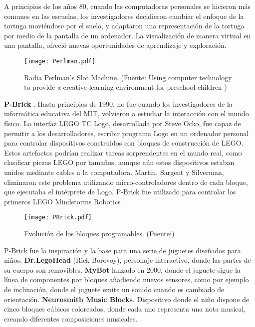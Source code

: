 A principios de los años 80, cuando las computadoras personales se hicieron más comunes en las escuelas, los investigadores decidieron cambiar el enfoque de la tortuga moviéndose por el suelo, y adaptaron una representación de la tortuga por medio de la pantalla de un ordenador. La visualización de manera virtual en una pantalla, ofreció nuevas oportunidades de aprendizaje y exploración.

\begin{figure}[!h]
\begin{center}
\texttt{[image: Perlman.pdf]}
\caption{Radia Perlman’s Slot Machine. (Fuente: Using computer technology to provide a creative learning environment for preschool children  \cite{Perlman})}
\label{fig:Perlman}
\end{center}
\end{figure}

\textbf{P-Brick} \cite{LegoLogo}. Hasta principios de 1990, no fue cuando los investigadores de la informática educativa del MIT, volvieron a estudiar la interacción con el mundo físico. La interfaz LEGO TC Logo, desarrollada por Steve Ocko, fue capaz de permitir a los desarrolladores, escribir programa Logo en un ordenador personal para controlar dispositivos construidos con bloques de construcción de LEGO. Estos artefactos podrían realizar tareas sorprendentes en el mundo real, como clasificar piezas LEGO por tamaños, aunque aún estos dispositivos estaban unidos mediante cables a la computadora. Martin, Sargent y Silverman, eliminaron este problema utilizando micro-controladores dentro de cada bloque, que ejecutaba el intérprete de Logo.
P-Brick fue utilizado para controlar los primeros LEGO Mindstorms Robotics

\begin{figure}[!h]
\begin{center}
\texttt{[image: PBrick.pdf]}
\caption{Evolución de los bloques programables. (Fuente:\cite{McNerney})}
\label{fig:PBrick}
\end{center}
\end{figure}

P-Brick fue la inspiración y la base para una serie de juguetes diseñados para niños. \textbf{Dr.LegoHead} (Rick Borovoy), personaje interactivo, donde las partes de su cuerpo son removibles. \textbf{MyBot} lanzado en 2000, donde el juguete sigue la línea de componentes por bloques añadiendo nuevos sensores, como por ejemplo de inclinación, donde el juguete emite un sonido cuando es cambiado de orientación.
\textbf{Neurosmith Music Blocks}. Dispositivo donde el niño dispone de cinco bloques cúbicos coloreados, donde cada uno representa una nota musical, creando diferentes composiciones musicales.

